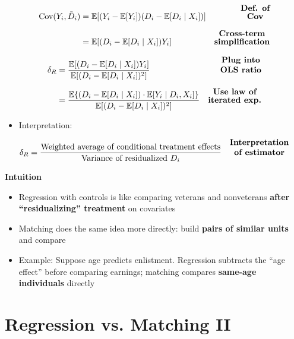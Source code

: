 \documentclass[12pt]{article}
\begin{document}
\singlespacing
\begin{align}
\text{Cov}(Y_i, \tilde{D}_i) 
   &= \mathbb{E}[(Y_i - \mathbb{E}[Y_i]) (D_i - \mathbb{E}[D_i \mid X_i])] 
   & \text{\textbf{\shortstack{Def. of \\ Cov}}} \\[6pt]
   &= \mathbb{E}[(D_i - \mathbb{E}[D_i \mid X_i]) Y_i] 
   & \text{\textbf{\shortstack{Cross-term \\ simplification}}}
\end{align}

\singlespacing
\begin{align}
\delta_R 
   &= \frac{\mathbb{E}[(D_i - \mathbb{E}[D_i \mid X_i])Y_i]}{\mathbb{E}[(D_i - \mathbb{E}[D_i \mid X_i])^2]} 
   & \text{\textbf{\shortstack{Plug into \\ OLS ratio}}} \\[6pt]
   &= \frac{\mathbb{E}\{(D_i - \mathbb{E}[D_i \mid X_i]) \cdot \mathbb{E}[Y_i \mid D_i, X_i]\}}{\mathbb{E}[(D_i - \mathbb{E}[D_i \mid X_i])^2]} 
   & \text{\textbf{\shortstack{Use law of \\ iterated exp.}}}
\end{align}

\begin{itemize}
    \item Interpretation:
\end{itemize}

\singlespacing
\begin{align}
\delta_R 
   &= \frac{\text{Weighted average of conditional treatment effects}}{\text{Variance of residualized $D_i$}} 
   & \text{\textbf{\shortstack{Interpretation \\ of estimator}}}
\end{align}

\textbf{Intuition}
\begin{itemize}
    \item Regression with controls is like comparing veterans and nonveterans 
    \textbf{after “residualizing” treatment} on covariates
    \item Matching does the same idea more directly: build \textbf{pairs of similar units} and compare
    \item Example: Suppose age predicts enlistment. Regression subtracts the “age effect” before comparing earnings; matching compares \textbf{same-age individuals} directly
\end{itemize}

\section*{\noindent\textbf{Regression vs. Matching II}}
\end{document}
